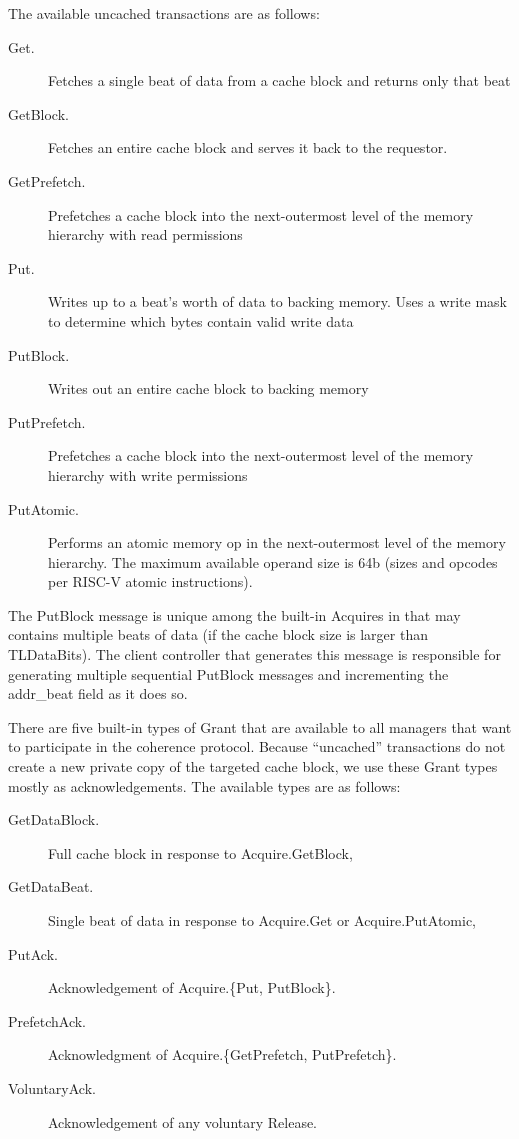 The available uncached transactions are as follows:
\begin{description}
\item[Get.] Fetches a single beat of data from a cache block and returns only that beat
\item[GetBlock.] Fetches an entire cache block and serves it back to the requestor.
\item[GetPrefetch.]  Prefetches a cache block into the next-outermost level of the memory hierarchy with read permissions
\item[Put.] Writes up to a beat's worth of data to backing memory. Uses a write mask to determine which bytes contain valid write data
\item[PutBlock.] Writes out an entire cache block to backing memory
\item[PutPrefetch.]  Prefetches a cache block into the next-outermost level of the memory hierarchy with write permissions
\item[PutAtomic.] Performs an atomic memory op in the next-outermost level of the memory hierarchy. The maximum available operand size is 64b (sizes and opcodes per RISC-V atomic instructions).
\end{description}

The PutBlock message is unique among the built-in Acquires in that may contains multiple beats of data (if the cache block size is larger than TLDataBits).
The client controller that generates this message is responsible for generating multiple sequential PutBlock messages and incrementing the addr\_beat field as it does so.

There are five built-in types of Grant that are available to all managers that want to participate in the coherence protocol.
Because ``uncached'' transactions do not create a new private copy of the targeted cache block, we use these Grant types mostly as acknowledgements.
The available types are as follows:
\begin{description}
\item[GetDataBlock.] Full cache block in response to Acquire.GetBlock,
\item[GetDataBeat.] Single beat of data in response to Acquire.Get or Acquire.PutAtomic,
\item[PutAck.] Acknowledgement of Acquire.\{Put, PutBlock\}.
\item[PrefetchAck.] Acknowledgment of Acquire.\{GetPrefetch, PutPrefetch\}.
\item[VoluntaryAck.] Acknowledgement of any voluntary Release.
\end{description}

